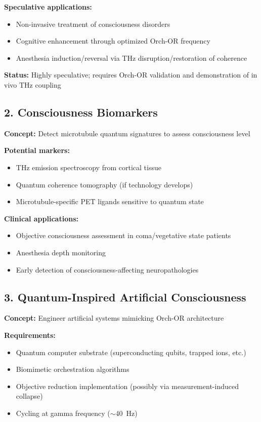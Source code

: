 \textbf{Speculative applications:}
\begin{itemize}
\item Non-invasive treatment of consciousness disorders
\item Cognitive enhancement through optimized Orch-OR frequency
\item Anesthesia induction/reversal via THz disruption/restoration of coherence
\end{itemize}

\textbf{Status:} Highly speculative; requires Orch-OR validation and demonstration of in vivo THz coupling

\subsection{2. Consciousness Biomarkers}

\textbf{Concept:} Detect microtubule quantum signatures to assess consciousness level

\textbf{Potential markers:}
\begin{itemize}
\item THz emission spectroscopy from cortical tissue
\item Quantum coherence tomography (if technology develops)
\item Microtubule-specific PET ligands sensitive to quantum state
\end{itemize}

\textbf{Clinical applications:}
\begin{itemize}
\item Objective consciousness assessment in coma/vegetative state patients
\item Anesthesia depth monitoring
\item Early detection of consciousness-affecting neuropathologies
\end{itemize}

\subsection{3. Quantum-Inspired Artificial Consciousness}

\textbf{Concept:} Engineer artificial systems mimicking Orch-OR architecture

\textbf{Requirements:}
\begin{itemize}
\item Quantum computer substrate (superconducting qubits, trapped ions, etc.)
\item Biomimetic orchestration algorithms
\item Objective reduction implementation (possibly via measurement-induced collapse)
\item Cycling at gamma frequency ($\sim$40~Hz)
\end{itemize}

